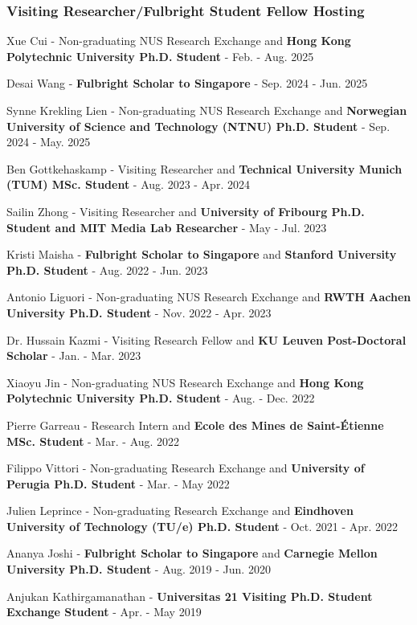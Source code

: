 \documentclass[10pt,a4paper]{article}
\begin{document}
\begin{small}
\subsubsection*{Visiting Researcher/Fulbright Student Fellow Hosting}
\begin{etaremune}
\item
Xue Cui - Non-graduating NUS Research Exchange and \textbf{Hong Kong Polytechnic University Ph.D. Student} - Feb. - Aug. 2025
\item
Desai Wang - \textbf{Fulbright Scholar to Singapore} - Sep. 2024 - Jun. 2025
\item
Synne Krekling Lien - Non-graduating NUS Research Exchange and \textbf{Norwegian University of Science and Technology (NTNU) Ph.D. Student} - Sep. 2024 - May. 2025
\item
Ben Gottkehaskamp - Visiting Researcher and \textbf{Technical University Munich (TUM) MSc. Student} - Aug. 2023 - Apr. 2024
\item
Sailin Zhong - Visiting Researcher and \textbf{University of Fribourg Ph.D. Student and MIT Media Lab Researcher} - May - Jul. 2023
\item
Kristi Maisha - \textbf{Fulbright Scholar to Singapore} and \textbf{Stanford University Ph.D. Student} - Aug. 2022 - Jun. 2023
\item
Antonio Liguori - Non-graduating NUS Research Exchange and \textbf{RWTH Aachen University Ph.D. Student} - Nov. 2022 - Apr. 2023
\item
Dr. Hussain Kazmi - Visiting Research Fellow and \textbf{KU Leuven Post-Doctoral Scholar} - Jan. - Mar. 2023
\item
Xiaoyu Jin - Non-graduating NUS Research Exchange and \textbf{Hong Kong Polytechnic University Ph.D. Student} - Aug. - Dec. 2022
\item
Pierre Garreau - Research Intern and \textbf{Ecole des Mines de Saint-Étienne MSc. Student} - Mar. - Aug. 2022
\item
Filippo Vittori - Non-graduating Research Exchange and \textbf{University of Perugia Ph.D. Student} - Mar. - May 2022
\item
Julien Leprince - Non-graduating Research Exchange and \textbf{Eindhoven University of Technology (TU/e) Ph.D. Student} - Oct. 2021 - Apr. 2022
\item 
Ananya Joshi - \textbf{Fulbright Scholar to Singapore} and \textbf{Carnegie Mellon University Ph.D. Student} - Aug. 2019 - Jun. 2020
\item
Anjukan Kathirgamanathan - \textbf{Universitas 21 Visiting Ph.D. Student Exchange Student} - Apr. - May 2019
\end{etaremune}


\end{small}
\end{document}
